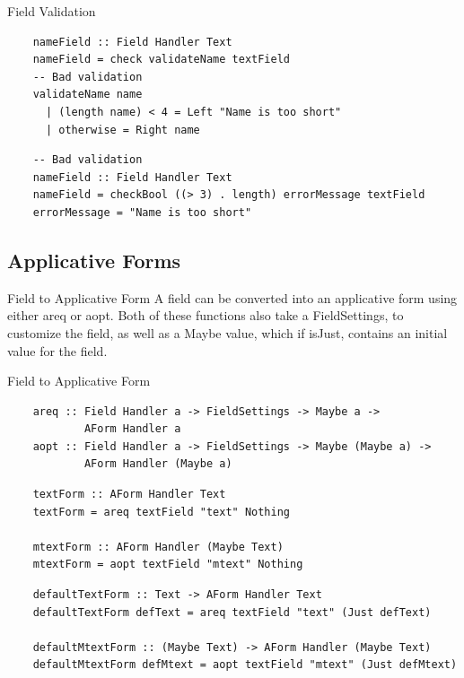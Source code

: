 \documentclass[pdf]{beamer}
\begin{document}
\begin{frame}[fragile]{Field Validation}
  \begin{verbatim}
    nameField :: Field Handler Text
    nameField = check validateName textField
    -- Bad validation
    validateName name
      | (length name) < 4 = Left "Name is too short"
      | otherwise = Right name
  \end{verbatim}
  \pause
  \begin{verbatim}
    -- Bad validation
    nameField :: Field Handler Text
    nameField = checkBool ((> 3) . length) errorMessage textField
    errorMessage = "Name is too short"
  \end{verbatim}
\end{frame}

\subsection{Applicative Forms}
\begin{frame}{Field to Applicative Form}
  A field can be converted into an applicative form using either areq
  or aopt. Both of these functions also take a FieldSettings, to
  customize the field, as well as a Maybe value, which if isJust,
  contains an initial value for the field.
\end{frame}

\begin{frame}[fragile]{Field to Applicative Form}
  \begin{verbatim}
    areq :: Field Handler a -> FieldSettings -> Maybe a ->
            AForm Handler a
    aopt :: Field Handler a -> FieldSettings -> Maybe (Maybe a) ->
            AForm Handler (Maybe a)
  \end{verbatim}
  \pause
  \begin{verbatim}
    textForm :: AForm Handler Text
    textForm = areq textField "text" Nothing

    mtextForm :: AForm Handler (Maybe Text)
    mtextForm = aopt textField "mtext" Nothing
  \end{verbatim}
  \pause
  \begin{verbatim}
    defaultTextForm :: Text -> AForm Handler Text
    defaultTextForm defText = areq textField "text" (Just defText)

    defaultMtextForm :: (Maybe Text) -> AForm Handler (Maybe Text)
    defaultMtextForm defMtext = aopt textField "mtext" (Just defMtext)
  \end{verbatim}
\end{frame}
\end{document}
